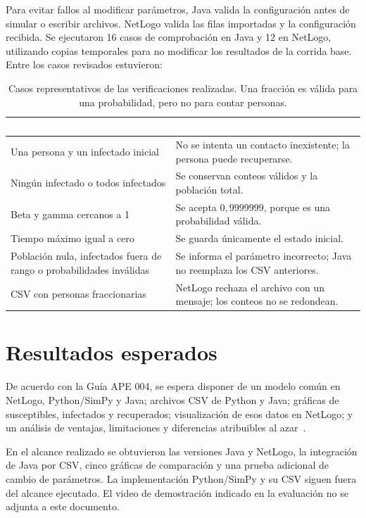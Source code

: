 \documentclass[11pt,a4paper]{article}
\renewcommand{\arraystretch}{1.08}
\newcommand{\cab}[1]{\textbf{\textcolor{white}{#1}}}
\newcommand{\tabestilo}{\arrayrulecolor{borderblue}\setlength{\arrayrulewidth}{0.75pt}\renewcommand{\arraystretch}{1.2}}
\begin{document}
Para evitar fallos al modificar parámetros, Java valida la configuración antes de simular o escribir archivos. NetLogo valida las filas importadas y la configuración recibida. Se ejecutaron 16 casos de comprobación en Java y 12 en NetLogo, utilizando copias temporales para no modificar los resultados de la corrida base. Entre los casos revisados estuvieron:
\begin{table}[H]
\centering\tabestilo\small
\begin{tabularx}{\textwidth}{|L{0.35\textwidth}|Y|}
\hline{}\cab{Caso revisado} & \cab{Comportamiento comprobado} \\ \hline
Una persona y un infectado inicial & No se intenta un contacto inexistente; la persona puede recuperarse. \\ \hline
{}Ningún infectado o todos infectados & Se conservan conteos válidos y la población total. \\ \hline
Beta y gamma cercanos a 1 & Se acepta $0{,}9999999$, porque es una probabilidad válida. \\ \hline
{}Tiempo máximo igual a cero & Se guarda únicamente el estado inicial. \\ \hline
Población nula, infectados fuera de rango o probabilidades inválidas & Se informa el parámetro incorrecto; Java no reemplaza los CSV anteriores. \\ \hline
{}CSV con personas fraccionarias & NetLogo rechaza el archivo con un mensaje; los conteos no se redondean. \\ \hline
\end{tabularx}
\caption{Casos representativos de las verificaciones realizadas. Una fracción es válida para una probabilidad, pero no para contar personas.}
\end{table}
\FloatBarrier

\section{Resultados esperados}
De acuerdo con la Guía APE 004, se espera disponer de un modelo común en NetLogo, Python/SimPy y Java; archivos CSV de Python y Java; gráficas de susceptibles, infectados y recuperados; visualización de esos datos en NetLogo; y un análisis de ventajas, limitaciones y diferencias atribuibles al azar~\cite{guia}.

En el alcance realizado se obtuvieron las versiones Java y NetLogo, la integración de Java por CSV, cinco gráficas de comparación y una prueba adicional de cambio de parámetros. La implementación Python/SimPy y su CSV siguen fuera del alcance ejecutado. El video de demostración indicado en la evaluación no se adjunta a este documento.
\end{document}

